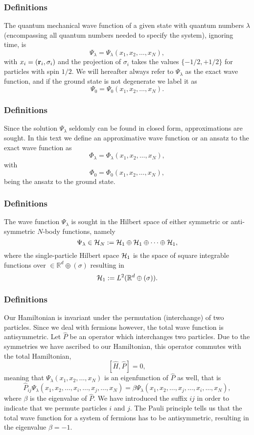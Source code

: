 \documentclass[compress]{beamer}
\begin{document}
\frame
{
\frametitle{Definitions}
The quantum mechanical wave function of a given state with quantum numbers $\lambda$ (encompassing all quantum numbers needed to specify the system), ignoring time, is
\[
\Psi_{\lambda}=\Psi_{\lambda}(x_1,x_2,\dots,x_N),
\]
with $x_i=({\bf r}_i,\sigma_i)$ and the projection of $\sigma_i$ takes the values
$\{-1/2,+1/2\}$ for particles with spin $1/2$. 
We will hereafter always refer to $\Psi_{\lambda}$ as the exact wave function, and if the ground state is not degenerate we label it as 
\[
\Psi_0=\Psi_0(x_1,x_2,\dots,x_N).
\]

}


\frame
{
\frametitle{Definitions}
Since the solution $\Psi_{\lambda}$ seldomly can be found in closed form, approximations are sought. In this text we define an approximative wave function or an ansatz to the exact wave function as 
\[
\Phi_{\lambda}=\Phi_{\lambda}(x_1,x_2,\dots,x_N),
\]
with 
\[
\Phi_0=\Phi_0(x_1,x_2,\dots,x_N),
\]
being the ansatz to the ground state.  
}


\frame
{
\frametitle{Definitions}
The wave function $\Psi_{\lambda}$ is sought in the Hilbert space of either symmetric or anti-symmetric $N$-body functions, namely
\[
\Psi_{\lambda}\in {\cal H}_N:= {\cal H}_1\oplus{\cal H}_1\oplus\dots\oplus{\cal H}_1,
\]
where the single-particle Hilbert space ${\cal H}_1$ is the space of square integrable functions over
$\in {\mathbb{R}}^{d}\oplus (\sigma)$
resulting in
\[
{\cal H}_1:= L^2(\mathbb{R}^{d}\oplus (\sigma)).
\]
}



\frame
{
\frametitle{Definitions}
Our Hamiltonian is invariant under the permutation (interchange) of two particles.
Since we deal with fermions however, the total wave function is antisymmetric.
Let $\hat{P}$ be an operator which interchanges two particles.
Due to the symmetries we have ascribed to our Hamiltonian, this operator commutes with the total Hamiltonian,
\[
[\hat{H},\hat{P}] = 0,
\]
meaning that $\Psi_{\lambda}(x_1, x_2, \dots , x_N)$ is an eigenfunction of 
$\hat{P}$ as well, that is
\[
\hat{P}_{ij}\Psi_{\lambda}(x_1, x_2, \dots,x_i,\dots,x_j,\dots,x_N)=
\beta\Psi_{\lambda}(x_1, x_2, \dots,x_j,\dots,x_i,\dots,x_N),
\]
where $\beta$ is the eigenvalue of $\hat{P}$. We have introduced the suffix $ij$ in order to indicate that we permute particles $i$ and $j$.
The Pauli principle tells us that the total wave function for a system of fermions
has to be antisymmetric, resulting in the eigenvalue $\beta = -1$.   

}
\end{document}
